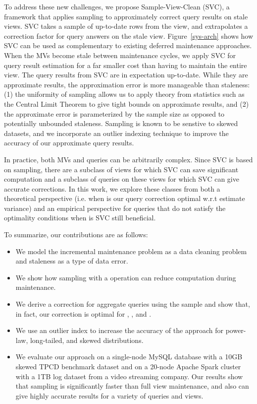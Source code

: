 To address these new challenges, we propose Sample-View-Clean (SVC), a framework that applies sampling to approximately correct query results on stale views.
SVC takes a sample of up-to-date rows from the view, and extrapolates a correction factor for query answers on the stale view. Figure~\ref{sys-arch} shows how SVC can be used as complementary to existing deferred maintenance approaches. When the MVs become stale between maintenance cycles, we apply SVC for query result estimation for a far smaller cost than having to maintain the entire view.
The query results from SVC are in expectation up-to-date. While they are approximate results, the approximation error is more manageable than staleness: (1) the uniformity of sampling allows us to apply theory from statistics such as the Central Limit Theorem to give tight bounds on approximate results, and (2) the approximate error is parameterized by the sample size as opposed to potentially unbounded staleness.
Sampling is known to be senstive to skewed datasets, and we incorporate an outlier indexing technique to improve the accuracy of our approximate query results.

In practice, both MVs and queries can be arbitrarily complex.
Since SVC is based on sampling, there are a subclass of views for which SVC can save significant computation and a subclass of queries on these views for which SVC can give accurate corrections.
In this work, we explore these classes from both a theoretical perspective (i.e. when is our query correction optimal w.r.t estimate variance) and an empirical perspective for queries that do not satisfy the optimality conditions when is SVC still beneficial.

To summarize, our contributions are as follows:
\begin{itemize}\vspace{-.45em}
\item We model the incremental maintenance problem as a data cleaning problem and staleness as a type of data error.\vspace{-.45em}
\item We show how sampling with a \hashop operation can reduce computation during maintenance. \vspace{-.45em}
\item We derive a correction for aggregate queries using the sample and show that, in fact, our correction is optimal for \sumfunc, \countfunc, and \avgfunc. \vspace{-.45em}
\item We use an outlier index to increase the accuracy of the approach for power-law, long-tailed, and skewed distributions.\vspace{-.45em}
\item We evaluate our approach on a single-node MySQL database with a 10GB skewed TPCD benchmark dataset and on a 20-node Apache Spark cluster with a 1TB log dataset from a video streaming company. Our results show that sampling is significantly faster than full view maintenance, and also can give highly accurate results for a variety of queries and views.\vspace{-.45em}
\end{itemize}

